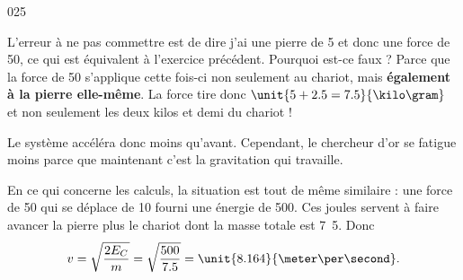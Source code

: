\begin{corrige}{025}

L'erreur à ne pas commettre est de dire \og j'ai une pierre de \unit{5}{\kilo\gram} et donc une force de \unit{50}{\newton}, ce qui est équivalent à l'exercice précédent\fg. Pourquoi est-ce faux ? Parce que la force de \unit{50}{\newton} s'applique cette fois-ci non seulement au chariot, mais {\bf également à la pierre elle-même}. La force tire donc $\unit{5+2.5=7.5}{\kilo\gram}$ et non seulement les deux kilos et demi du chariot !

Le système accéléra donc moins qu'avant. Cependant, le chercheur d'or se fatigue moins parce que maintenant c'est la gravitation qui travaille.

En ce qui concerne les calculs, la situation est tout de même similaire : une force de \unit{50}{\newton} qui se déplace de \unit{10}{\meter} fourni une énergie de \unit{500}{\joule}. Ces joules servent à faire avancer la pierre plus le chariot dont la masse totale est \unit{7.5}{\kilo\gram}. Donc
\[ 
  v=\sqrt{ \frac{ 2E_C }{ m } }=\sqrt{ \frac{ 500 }{ 7.5 } }=\unit{8.164}{\meter\per\second}.
\]


\end{corrige}
